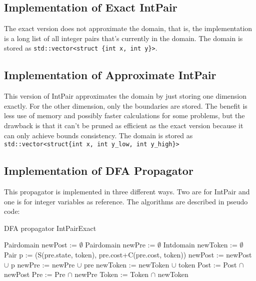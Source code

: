 \documentclass[a4paper,11pt]{article}
\begin{document}
\subsection{Implementation of Exact IntPair}
The exact version does not approximate the domain, that is, the implementation is a long list of all integer pairs that's currently in the domain. The domain is stored as \texttt{std::vector<struct \{int x, int y\}>}. 

\subsection{Implementation of Approximate IntPair}
This version of IntPair approximates the domain by just storing one dimension exactly. For the other dimension, only the boundaries are stored. The benefit is less use of memory and possibly faster calculations for some problems, but the drawback is that it can't be pruned as efficient as the exact version because it can only achieve bounds consistency. The domain is stored as \texttt{std::vector<struct\{int x, int y\_low, int y\_high\}>}

\subsection{Implementation of DFA Propagator}
This propagator is implemented in three different ways. Two are for IntPair and one is for integer variables as reference. The algorithms are described in pseudo code:
\begin{algorithm}
\caption{DFA propagator IntPairExact}
\begin{algorithmic}[1]
\State Pairdomain newPost := $\emptyset$
\State Pairdomain newPre := $\emptyset$
\State Intdomain newToken := $\emptyset$
		\State Pair p := (S(pre.state, token), pre.cost+C(pre.cost, token))
			\State newPost := newPost $\cup$ p
			\State newPre := newPre $\cup$ pre
			\State newToken := newToken $\cup$ token 
		\EndIf
	\EndFor
\EndFor
\State Post := Post $\cap$ newPost
\State Pre := Pre $\cap$ newPre
\State Token := Token $\cap$ newToken
\EndProcedure
\end{algorithmic}
\end{algorithm}
\end{document}
